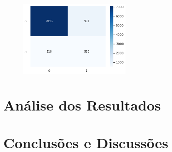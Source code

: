 \documentclass[conference]{IEEEtran}
\begin{document}
\begin{figure}[H]
    \centerline{\includegraphics[width=0.5\textwidth]{cm-gaussiano.png}}
\end{figure}


\section{Análise dos Resultados}

\section{Conclusões e Discussões}





\nocite{*}

\end{document}
